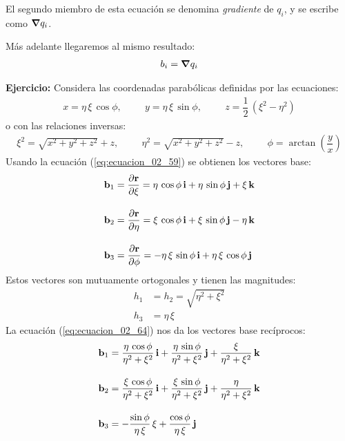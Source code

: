 \documentclass[12pt]{article}
\begin{document}
El segundo miembro de esta ecuación se denomina \emph{gradiente} de $q_{i}$, y se escribe como $\grad{q_{i}}$.
\par
Más adelante llegaremos al mismo resultado:
\begin{align}
    b_{i} = \grad{q_{i}}
    \label{eq:ecuacion_02_68}
\end{align}
\par
\noindent
\textbf{Ejercicio: } Considera las coordenadas parabólicas definidas por las ecuaciones:
\begin{align*}
    x = \eta \, \xi \, \cos \phi, \hspace{1cm} y = \eta \, \xi \, \sin \phi, \hspace{1cm} z = \dfrac{1}{2} \, \left( \xi^{2} - \eta^{2} \right)
\end{align*}
o con las relaciones inversas:
\begin{align*}
    \xi^{2} = \sqrt{x^{2} + y^{2} + z^{2}} + z, \hspace{1cm} \eta^{2} = \sqrt{x^{2} + y^{2} + z^{2}} - z, \hspace{1cm} \phi = \arctan \left( \dfrac{y}{x} \right) 
\end{align*}
Usando la ecuación (\ref{eq:ecuacion_02_59}) se obtienen los vectores base:
\begin{align*}
    \vb{b}_{1} &= \pdv{\vb{r}}{\xi} = \eta \, \cos \phi \, \vb{i} + \eta \, \sin \phi \, \vb{j} + \xi \, \vb{k} \\[1em]
    \vb{b}_{2} &= \pdv{\vb{r}}{\eta} = \xi \, \cos \phi \, \vb{i} + \xi \, \sin \phi \, \vb{j} - \eta \, \vb{k} \\[1em]
    \vb{b}_{3} &= \pdv{\vb{r}}{\phi} = - \eta \, \xi \, \sin \phi \, \vb{i} + \eta \, \xi \, \cos \phi \, \vb{j}
\end{align*}
Estos vectores son mutuamente ortogonales y tienen las magnitudes:
\begin{align*}
    h_{1} &= h_{2} = \sqrt{\eta^{2} + \xi^{2}} \\[0.5em]
    h_{3} &= \eta \, \xi
\end{align*} 
La ecuación (\ref{eq:ecuacion_02_64}) nos da los vectores base recíprocos:
\begin{align*}
    \vb{b}_{1} &= \dfrac{ \eta \, \cos \phi}{\eta^{2} + \xi^{2}} \, \vb{i} + \dfrac{\eta \, \sin \phi}{\eta^{2} + \xi^{2}} \, \vb{j} + \dfrac{\xi}{\eta^{2} + \xi^{2}} \, \vb{k} \\[1em]
    \vb{b}_{2} &= \dfrac{ \xi \, \cos \phi}{\eta^{2} + \xi^{2}} \, \vb{i} + \dfrac{\xi \, \sin \phi}{\eta^{2} + \xi^{2}} \, \vb{j} + \dfrac{\eta}{\eta^{2} + \xi^{2}} \, \vb{k} \\[1em]
    \vb{b}_{3} &= - \dfrac{\sin \phi}{\eta \, \xi} \, \xi + \dfrac{\cos \phi}{\eta \, \xi} \, \vb{j}
\end{align*}
\end{document}
